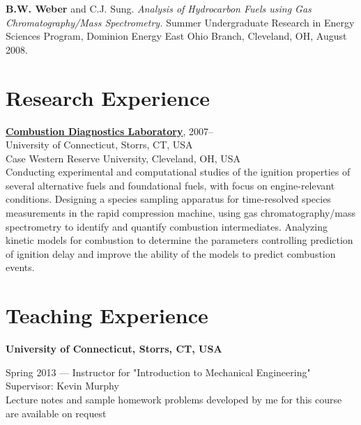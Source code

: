 \begin{bibsection}
\item[] \textbf{ B.W. Weber} and C.J. Sung. \textit{Analysis of
        Hydrocarbon Fuels using Gas Chromatography/Mass Spectrometry.}
        Summer Undergraduate Research in Energy Sciences Program,
        Dominion Energy East Ohio Branch, Cleveland, OH, August 2008.
\end{bibsection}

\vspace{0.1in}

\section{{\sectionfont Research Experience}}

\href{http://combdiaglab.engr.uconn.edu}
{\textbf{Combustion Diagnostics Laboratory}}, 2007--\\
University of Connecticut, Storrs, CT, USA\\
Case Western Reserve University, Cleveland, OH, USA\\

Conducting experimental and computational studies of the ignition
properties of several alternative fuels and foundational fuels, with
focus on engine-relevant conditions.
Designing a species sampling apparatus for time-resolved
species measurements in the rapid compression machine, using gas
chromatography/mass spectrometry to identify and quantify
combustion intermediates.
Analyzing kinetic models for combustion to determine the parameters
controlling prediction of ignition delay and improve the ability of
the models to predict combustion events.

\section{{\sectionfont Teaching Experience}}

\textbf{University of Connecticut, Storrs, CT, USA}

\vspace{\baselineskip}

Spring 2013 --- Instructor for "Introduction to Mechanical Engineering"\\
Supervisor: Kevin Murphy\\
Lecture notes and sample homework problems developed by me for this course
are available on request

\vspace{\baselineskip}

